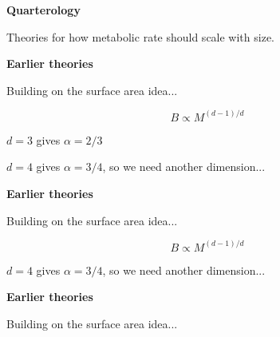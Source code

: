 {%



  \textbf{Quarterology}

Theories for how metabolic rate should scale with size.


  \textbf{Earlier theories}

Building on the surface area idea...


$$B \propto M^{(d-1)/d}$$

\inv

$d=3$ gives $\alpha = 2/3$

$d=4$ gives $\alpha = 3/4$, so we need another dimension...

\vis


  \textbf{Earlier theories}

Building on the surface area idea...


$$B \propto M^{(d-1)/d}$$


\inv

$d=4$ gives $\alpha = 3/4$, so we need another dimension...

\vis


  \textbf{Earlier theories}

Building on the surface area idea...

}
